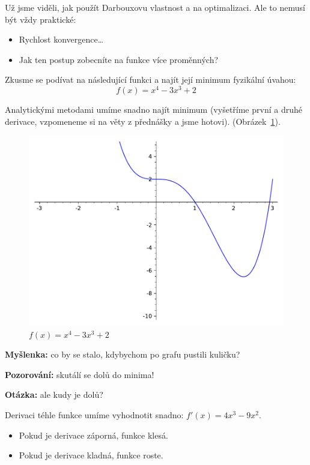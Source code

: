 Už jsme viděli, jak použít Darbouxovu vlastnost a  na optimalizaci.
Ale to nemusí být vždy praktické:
\begin{itemize}

	\item  Rychlost konvergence\ldots

	\item  Jak ten postup zobecníte na funkce více proměnných?

\end{itemize}

Zkusme se podívat na následující funkci a najít její minimum fyzikální úvahou:
$$f(x) = x^4 - 3x^3 + 2$$

Analytickými metodami umíme snadno najít minimum (vyšetříme první a druhé derivace, vzpomeneme si na věty z přednášky a jsme hotovi).
(Obrázek~\ref{fig:gradient_descend}).
\begin{figure}[H]
	\centering
	\includegraphics{bonus/fig/gd.pdf}
	\caption{$f(x) = x^4 - 3x^3 + 2$}
	\label{fig:gradient_descend}
\end{figure}

\textbf{Myšlenka:} co by se stalo, kdybychom po grafu pustili kuličku?

\textbf{Pozorování:} skutálí se dolů do minima!

\textbf{Otázka:} ale kudy je dolů?

Derivaci téhle funkce umíme vyhodnotit snadno: $f'(x) = 4x^3 - 9x^2$.
\begin{itemize}
	\item  Pokud je derivace záporná, funkce klesá.
	\item  Pokud je derivace kladná, funkce roste.
\end{itemize}

